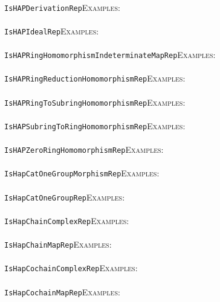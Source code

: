\documentclass[a4paper,11pt]{report}
\begin{document}
{{ \\
 \texttt{IsHAPDerivationRep}{\nobreakspace}{\nobreakspace}{\nobreakspace}{\nobreakspace}\textsc{Examples:} \\
 \\
 \texttt{IsHAPIdealRep}{\nobreakspace}{\nobreakspace}{\nobreakspace}{\nobreakspace}\textsc{Examples:} \\
 \\
 \texttt{IsHAPRingHomomorphismIndeterminateMapRep}{\nobreakspace}{\nobreakspace}{\nobreakspace}{\nobreakspace}\textsc{Examples:} \\
 \\
 \texttt{IsHAPRingReductionHomomorphismRep}{\nobreakspace}{\nobreakspace}{\nobreakspace}{\nobreakspace}\textsc{Examples:} \\
 \\
 \texttt{IsHAPRingToSubringHomomorphismRep}{\nobreakspace}{\nobreakspace}{\nobreakspace}{\nobreakspace}\textsc{Examples:} \\
 \\
 \texttt{IsHAPSubringToRingHomomorphismRep}{\nobreakspace}{\nobreakspace}{\nobreakspace}{\nobreakspace}\textsc{Examples:} \\
 \\
 \texttt{IsHAPZeroRingHomomorphismRep}{\nobreakspace}{\nobreakspace}{\nobreakspace}{\nobreakspace}\textsc{Examples:} \\
 \\
 \texttt{IsHapCatOneGroupMorphismRep}{\nobreakspace}{\nobreakspace}{\nobreakspace}{\nobreakspace}\textsc{Examples:} \\
 \\
 \texttt{IsHapCatOneGroupRep}{\nobreakspace}{\nobreakspace}{\nobreakspace}{\nobreakspace}\textsc{Examples:} \\
 \\
 \texttt{IsHapChainComplexRep}{\nobreakspace}{\nobreakspace}{\nobreakspace}{\nobreakspace}\textsc{Examples:} \\
 \\
 \texttt{IsHapChainMapRep}{\nobreakspace}{\nobreakspace}{\nobreakspace}{\nobreakspace}\textsc{Examples:} \\
 \\
 \texttt{IsHapCochainComplexRep}{\nobreakspace}{\nobreakspace}{\nobreakspace}{\nobreakspace}\textsc{Examples:} \\
 \\
 \texttt{IsHapCochainMapRep}{\nobreakspace}{\nobreakspace}{\nobreakspace}{\nobreakspace}\textsc{Examples:} \\
}}
\end{document}
